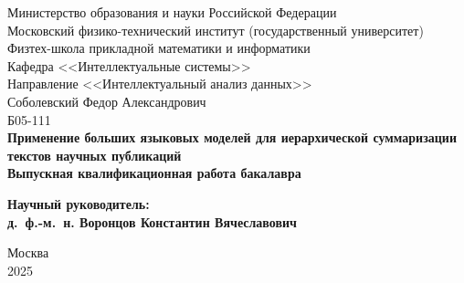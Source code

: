 \documentclass[12pt]{article}
\begin{document}
\thispagestyle{empty}
\begin{center}
    \sc
        Министерство образования и науки Российской Федерации\\
        Московский физико-технический институт
        {\rm(государственный университет)}\\
        Физтех-школа прикладной математики и информатики\\
        Кафедра <<Интеллектуальные системы>>\\
        Направление <<Интеллектуальный анализ данных>> \\[30mm]
    \rm\large
        Соболевский Федор Александрович\\
        Б05-111\\[10mm]
    \bf\Large
	Применение больших языковых моделей 
        для иерархической суммаризации
        текстов научных публикаций \\[10mm]
    \rm\normalsize
    \sc
        Выпускная квалификационная работа бакалавра\\[10mm]
\end{center}
\hfill\parbox{90mm}{
    \begin{flushleft}
    \bf
        Научный руководитель:\\
    \rm
        д.~ф.-м.~н. Воронцов Константин Вячеславович\\[5cm]
    \end{flushleft}
}
\begin{center}
    Москва\\
    2025
\end{center}


\newpage
\tableofcontents
\newpage
\end{document}

